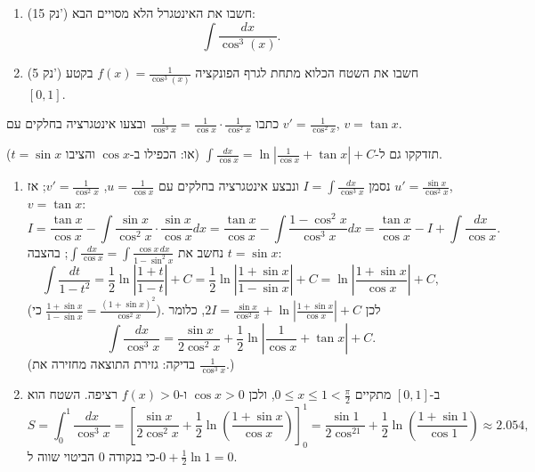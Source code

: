 
\begin{question}
\begin{enumerate}
  \item (15 נק') חשבו את האינטגרל הלא מסויים הבא:
  \[ \int\frac{dx}{\cos^3(x)}. \]
  \item (5 נק') חשבו את השטח הכלוא מתחת לגרף הפונקציה $f(x)=\frac{1}{\cos^3(x)}$ בקטע $[0,1]$.
\end{enumerate}
\end{question}

\begin{hint}
כתבו $\frac{1}{\cos^3x}=\frac{1}{\cos x}\cdot\frac1{\cos^2x}$ ובצעו אינטגרציה בחלקים עם $v'=\frac1{\cos^2x}$, $v=\tan x$.
\end{hint}

\begin{hint}
תזדקקו גם ל-$\int\frac{dx}{\cos x}=\ln\left|\frac1{\cos x}+\tan x\right|+C$ (או: הכפילו ב-$\cos x$ והציבו $t=\sin x$).
\end{hint}

\begin{solution}
\begin{enumerate}
  \item נסמן $I=\int\frac{dx}{\cos^3x}$ ונבצע אינטגרציה בחלקים עם $u=\frac1{\cos x}$, $v'=\frac1{\cos^2x}$; אז $u'=\frac{\sin x}{\cos^2x}$, $v=\tan x$:
  \[ I=\frac{\tan x}{\cos x}-\int\frac{\sin x}{\cos^2x}\cdot\frac{\sin x}{\cos x}dx=\frac{\tan x}{\cos x}-\int\frac{1-\cos^2x}{\cos^3x}dx=\frac{\tan x}{\cos x}-I+\int\frac{dx}{\cos x}. \]
  נחשב את $\int\frac{dx}{\cos x}=\int\frac{\cos x\,dx}{1-\sin^2x}$; בהצבה $t=\sin x$:
  \[ \int\frac{dt}{1-t^2}=\frac12\ln\left|\frac{1+t}{1-t}\right|+C=\frac12\ln\left|\frac{1+\sin x}{1-\sin x}\right|+C=\ln\left|\frac{1+\sin x}{\cos x}\right|+C, \]
  (כי $\frac{1+\sin x}{1-\sin x}=\frac{(1+\sin x)^2}{\cos^2x}$). לכן $2I=\frac{\sin x}{\cos^2x}+\ln\left|\frac{1+\sin x}{\cos x}\right|+C$, כלומר
  \[ \boxed{\int\frac{dx}{\cos^3x}=\frac{\sin x}{2\cos^2x}+\frac12\ln\left|\frac{1}{\cos x}+\tan x\right|+C.} \]
  (בדיקה: גזירת התוצאה מחזירה את $\frac1{\cos^3x}$.)

  \item ב-$[0,1]$ מתקיים $0\le x\le1<\frac\pi2$, ולכן $\cos x>0$ ו-$f(x)>0$ רציפה. השטח הוא
  \[ S=\int_0^1\frac{dx}{\cos^3x}=\left[\frac{\sin x}{2\cos^2x}+\frac12\ln\left(\frac{1+\sin x}{\cos x}\right)\right]_0^1
      =\boxed{\frac{\sin1}{2\cos^21}+\frac12\ln\left(\frac{1+\sin1}{\cos1}\right)}\approx2.054, \]
  כי בנקודה $0$ הביטוי שווה ל-$0+\frac12\ln1=0$.
\end{enumerate}
\end{solution}
